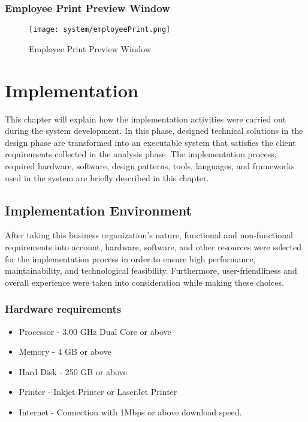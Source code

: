 \documentclass[12pt]{report}
\begin{document}
\subsection{Employee Print Preview Window}
\begin{figure}[H]
	\centering
	\texttt{[image: system/employeePrint.png]}
	\caption{Employee Print Preview Window}
\end{figure}

\newpage
\chapter{Implementation}
This chapter will explain how the implementation activities were carried out during the system development. In this phase, designed technical solutions in the design phase are transformed into an executable system that satisfies the client requirements collected in the analysis phase. The implementation process, required hardware, software, design patterns, tools, languages, and frameworks used in the system are briefly described in this chapter.


\section{Implementation Environment}
After taking this business organization's nature, functional and non-functional requirements into account, hardware, software, and other resources were selected for the implementation process in order to ensure high performance, maintainability, and technological feasibility. Furthermore, user-friendliness and overall experience were taken into consideration while making these choices.

\subsection{Hardware requirements}
\begin{itemize}
	\item Processor - 3.00 GHz Dual Core or above
	\item Memory - 4 GB or above
	\item Hard Disk - 250 GB or above
	\item Printer - Inkjet Printer or LaserJet Printer
	\item Internet - Connection with 1Mbps or above download speed.
\end{itemize}
\end{document}
